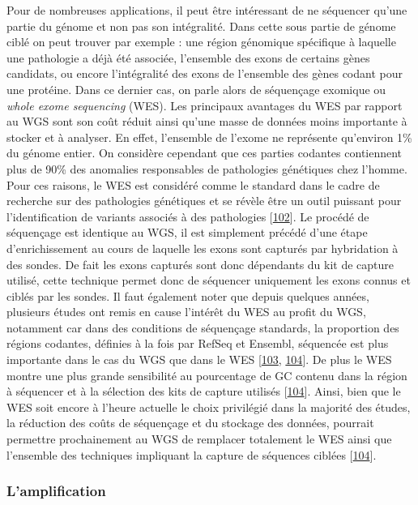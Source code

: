 \documentclass[12pt,twoside]{ugathesis}
\theoremstyle{definition}
\theoremstyle{definition}
\theoremstyle{remark}
\begin{document}
Pour de nombreuses applications, il peut être intéressant de ne
séquencer qu'une partie du génome et non pas son intégralité. Dans cette
sous partie de génome ciblé on peut trouver par exemple : une région
génomique spécifique à laquelle une pathologie a déjà été associée,
l'ensemble des exons de certains gènes candidats, ou encore
l'intégralité des exons de l'ensemble des gènes codant pour une
protéine. Dans ce dernier cas, on parle alors de séquençage exomique ou
\emph{whole exome sequencing} (WES). Les principaux avantages du WES par
rapport au WGS sont son coût réduit ainsi qu'une masse de données moins
importante à stocker et à analyser. En effet, l'ensemble de l'exome ne
représente qu'environ 1\% du génome entier. On considère cependant que
ces parties codantes contiennent plus de 90\% des anomalies responsables
de pathologies génétiques chez l'homme. Pour ces raisons, le WES est
considéré comme le standard dans le cadre de recherche sur des
pathologies génétiques et se révèle être un outil puissant pour
l'identification de variants associés à des pathologies
{[}\protect\hyperlink{ref-Ng2010}{102}{]}. Le procédé de séquençage est
identique au WGS, il est simplement précédé d'une étape d'enrichissement
au cours de laquelle les exons sont capturés par hybridation à des
sondes. De fait les exons capturés sont donc dépendants du kit de
capture utilisé, cette technique permet donc de séquencer uniquement les
exons connus et ciblés par les sondes. Il faut également noter que
depuis quelques années, plusieurs études ont remis en cause l'intérêt du
WES au profit du WGS, notamment car dans des conditions de séquençage
standards, la proportion des régions codantes, définies à la fois par
RefSeq et Ensembl, séquencée est plus importante dans le cas du WGS que
dans le WES {[}\protect\hyperlink{ref-Lelieveld2015}{103},
\protect\hyperlink{ref-Meienberg2016}{104}{]}. De plus le WES montre une
plus grande sensibilité au pourcentage de GC contenu dans la région à
séquencer et à la sélection des kits de capture utilisés
{[}\protect\hyperlink{ref-Meienberg2016}{104}{]}. Ainsi, bien que le WES
soit encore à l'heure actuelle le choix privilégié dans la majorité des
études, la réduction des coûts de séquençage et du stockage des données,
pourrait permettre prochainement au WGS de remplacer totalement le WES
ainsi que l'ensemble des techniques impliquant la capture de séquences
ciblées {[}\protect\hyperlink{ref-Meienberg2016}{104}{]}.

\subsubsection{L'amplification}\label{lamplification}
\end{document}
